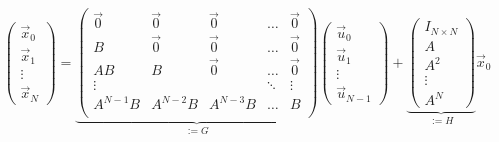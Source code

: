 \documentclass{article}
\begin{document}
\thispagestyle{empty}
$$
\begin{pmatrix}\vec{x}_0\\ \vec{x}_1 \\ \vdots \\ \vec{x}_N\end{pmatrix} =
\underbrace{\begin{pmatrix}
\vec{0}  & \vec{0}  & \vec{0}  & \dots  & \vec{0} \\
B        & \vec{0}  & \vec{0}  & \dots  & \vec{0} \\
AB       & B        & \vec{0}  & \dots  & \vec{0} \\
\vdots   &          &          & \ddots & \vdots  \\
A^{N-1}B & A^{N-2}B & A^{N-3}B & \dots  & B       \\
\end{pmatrix}}_{:= G}
\begin{pmatrix}\vec{u}_0\\ \vec{u}_1 \\ \vdots \\ \vec{u}_{N-1}\end{pmatrix} 
+
\underbrace{\begin{pmatrix}I_{N\times N}\\A\\A^2\\\vdots\\A^N\end{pmatrix}}_{:= H}\vec{x}_0
$$
\end{document}
